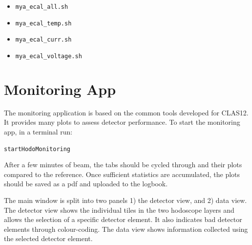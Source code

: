 \documentclass[12pt]{article}
\begin{document}
      \begin{itemize}
          \item \texttt{mya\_ecal\_all.sh}
          \item \texttt{mya\_ecal\_temp.sh}
          \item \texttt{mya\_ecal\_curr.sh}
          \item \texttt{mya\_ecal\_voltage.sh}
      \end{itemize}



\section{Monitoring App}
The monitoring application is based on the common tools developed for CLAS12. It provides many plots to assess detector performance.  To start the monitoring app, in a terminal run:
\begin{center}\texttt{startHodoMonitoring}\end{center}

 After a few minutes of beam, the tabs should be cycled through and their plots compared to the reference.  Once sufficient statistics are accumulated, the plots should be saved as a pdf and uploaded to the logbook.

The main window is split into two panels 1) the detector view, and 2) data view. The detector view shows the individual tiles in the two hodoscope layers and allows the selection of a specific detector element. It also indicates bad detector elements through colour-coding. The data view shows information collected using the selected detector element. 

%
%
%
%
%
\end{document}
